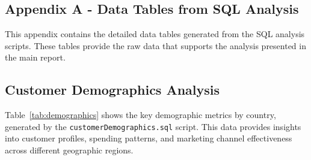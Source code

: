 \documentclass[12pt,a4paper]{article}
\newcommand{\textittt}[1]{\texttt{#1}}
\begin{document}
\begin{appendix}
\section{Appendix A - Data Tables from SQL Analysis}\label{a1}
This appendix contains the detailed data tables generated from the SQL analysis scripts. These tables provide the raw data that supports the analysis presented in the main report.

\subsection{Customer Demographics Analysis}\label{a1:s1}
\label{app:customerdemographics}

Table~\ref{tab:demographics} shows the key demographic metrics by country, generated by the \textittt{customerDemographics.sql} script. This data provides insights into customer profiles, spending patterns, and marketing channel effectiveness across different geographic regions.


\end{appendix}
\end{document}
